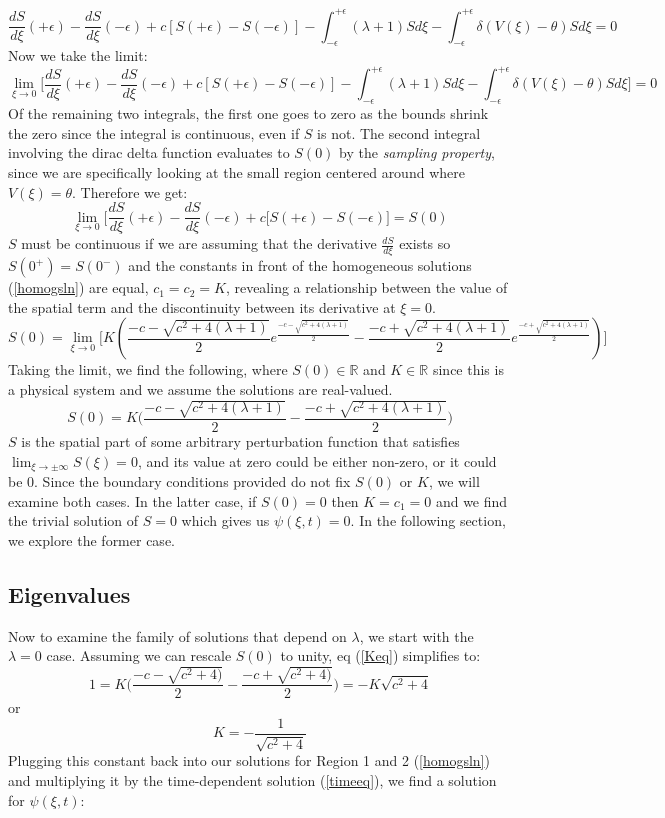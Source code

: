 \documentclass[12pt]{article}
\begin{document}
$$ \frac{dS}{d\xi}(+\epsilon) - \frac{dS}{d\xi}(-\epsilon) + c[S(+\epsilon) - S(-\epsilon)] - \int_{-\epsilon}^{+\epsilon}(\lambda + 1)Sd\xi - \int_{-\epsilon}^{+\epsilon}\delta(V(\xi)-\theta)Sd\xi = 0 $$
Now we take the limit:
$$ \lim_{\xi \to 0} \Bigg[ \frac{dS}{d\xi}(+\epsilon) - \frac{dS}{d\xi}(-\epsilon) + c[S(+\epsilon) - S(-\epsilon)] - \int_{-\epsilon}^{+\epsilon}(\lambda + 1)Sd\xi - \int_{-\epsilon}^{+\epsilon}\delta(V(\xi)-\theta)Sd\xi \Bigg]= 0 $$
Of the remaining two integrals, the first one goes to zero as the bounds shrink the zero since the integral is continuous, even if $S$ is not. The second integral involving the dirac delta function evaluates to $S(0)$ by the \textit{sampling property}, since we are specifically looking at the small region centered around where $V(\xi) = \theta$. Therefore we get:
$$ \lim_{\xi \to 0} \Bigg[ \frac{dS}{d\xi}(+\epsilon) - \frac{dS}{d\xi}(-\epsilon) + c[S(+\epsilon) - S(-\epsilon) \Bigg] = S(0) $$
$S$ must be continuous if we are assuming that the derivative $\frac{dS}{d\xi}$ exists so $S(0^+) = S(0^-)$ and the constants in front of the homogeneous solutions (\ref{homogsln}) are equal, $c_1 = c_2 = K$, revealing a relationship between the value of the spatial term and the discontinuity between its derivative at $\xi=0$.
$$ S(0) = \lim_{\xi \to 0} \Bigg[ K(\frac{-c-\sqrt{c^2+4(\lambda+1)}}{2}e^{\frac{-c-\sqrt{c^2+4(\lambda+1)}}{2}} - \frac{-c+\sqrt{c^2+4(\lambda+1)}}{2}e^{\frac{-c+\sqrt{c^2+4(\lambda+1)}}{2}})\Bigg] $$
Taking the limit, we find the following, where $S(0)\in \mathbb{R}$ and $K\in\mathbb{R}$ since this is a physical system and we assume the solutions are real-valued.
\begin{equation}\label{Keq}
S(0) = K\Bigg(\frac{-c-\sqrt{c^2+4(\lambda+1)}}{2} - \frac{-c+\sqrt{c^2+4(\lambda+1)}}{2} \Bigg)
\end{equation}
$S$ is the spatial part of some arbitrary perturbation function that satisfies $\lim_{\xi \to \pm \infty}S(\xi) = 0$, and its value at zero could be either non-zero, or it could be 0. Since the boundary conditions provided do not fix $S(0)$ or $K$, we will examine both cases. In the latter case, if $S(0) = 0$ then $K=c_1=0$ and we find the trivial solution of $S=0$ which gives us $\psi(\xi,t) = 0$. In the following section, we explore the former case.


\subsection{Eigenvalues}
Now to examine the family of solutions that depend on $\lambda$, we start with the $\lambda = 0$ case. Assuming we can rescale $S(0)$ to unity, eq (\ref{Keq}) simplifies to:
$$1 = K\Bigg(\frac{-c-\sqrt{c^2+4)}}{2} - \frac{-c+\sqrt{c^2+4)}}{2}\Bigg) = -K\sqrt{c^2+4} $$
or
$$K = -\frac{1}{\sqrt{c^2+4}}$$
Plugging this constant back into our solutions for Region 1 and 2 (\ref{homogsln}) and multiplying it by the time-dependent solution (\ref{timeeq}), we find a solution for $\psi(\xi,t)$:
\end{document}
